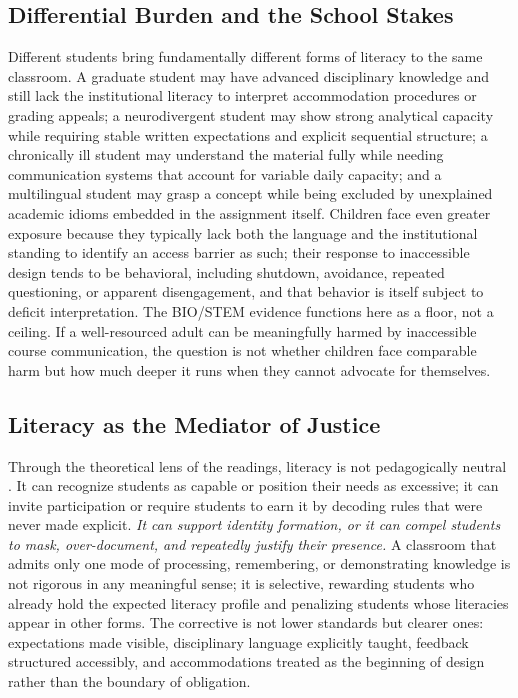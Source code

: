 \documentclass[11pt]{article}
\begin{document}
\subsection*{Differential Burden and the School Stakes}

Different students bring fundamentally different forms of literacy to the same classroom. A graduate student may have advanced disciplinary knowledge and still lack the institutional literacy to interpret accommodation procedures or grading appeals; a neurodivergent student may show strong analytical capacity while requiring stable written expectations and explicit sequential structure; a chronically ill student may understand the material fully while needing communication systems that account for variable daily capacity; and a multilingual student may grasp a concept while being excluded by unexplained academic idioms embedded in the assignment itself. Children face even greater exposure because they typically lack both the language and the institutional standing to identify an access barrier as such; their response to inaccessible design tends to be behavioral, including shutdown, avoidance, repeated questioning, or apparent disengagement, and that behavior is itself subject to deficit interpretation. The BIO/STEM evidence functions here as a floor, not a ceiling. If a well-resourced adult can be meaningfully harmed by inaccessible course communication, the question is not whether children face comparable harm but how much deeper it runs when they cannot advocate for themselves.

\subsection*{Literacy as the Mediator of Justice}

Through the theoretical lens of the readings, literacy is not pedagogically neutral \citep{knobel2007newliteracies,stornaiuolo2017writing}. It can recognize students as capable or position their needs as excessive; it can invite participation or require students to earn it by decoding rules that were never made explicit. \textit{It can support identity formation, or it can compel students to mask, over-document, and repeatedly justify their presence.} A classroom that admits only one mode of processing, remembering, or demonstrating knowledge is not rigorous in any meaningful sense; it is selective, rewarding students who already hold the expected literacy profile and penalizing students whose literacies appear in other forms. The corrective is not lower standards but clearer ones: expectations made visible, disciplinary language explicitly taught, feedback structured accessibly, and accommodations treated as the beginning of design rather than the boundary of obligation.
\end{document}
